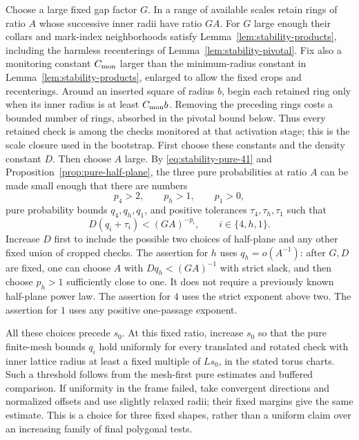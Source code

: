 Choose a large fixed gap factor $G$.  In a range of available scales
retain rings of ratio $A$ whose successive inner radii have ratio
$GA$.  For $G$ large enough their collars and mark-index
neighborhoods satisfy Lemma~\ref{lem:stability-products}, including
the harmless recenterings of Lemma~\ref{lem:stability-pivotal}.
Fix also a monitoring constant $C_{\rm mon}$ larger than the
minimum-radius constant in Lemma~\ref{lem:stability-products}, enlarged
to allow the fixed crops and recenterings.  Around an inserted square
of radius $b$, begin each retained ring only when its inner radius
is at least $C_{\rm mon}b$.  Removing the preceding rings costs a
bounded number of rings, absorbed in the pivotal bound below.
Thus every retained check is among the checks monitored at that
activation stage; this is the scale closure used in the bootstrap.
First choose these constants and the density constant $D$.  Then choose $A$
large.  By \eqref{eq:stability-pure-41} and
Proposition~\ref{prop:pure-half-plane}, the three pure probabilities
at ratio $A$ can be made small enough that there are numbers
\begin{equation}
 p_4>2,\qquad p_h>1,\qquad p_1>0,
 \label{eq:stability-exponents}
\end{equation}
pure probability bounds $q_4,q_h,q_1$, and positive tolerances
$\tau_4,\tau_h,\tau_1$ such that
\begin{equation}
 D(q_i+\tau_i)<(GA)^{-p_i},\qquad i\in\{4,h,1\}.
 \label{eq:stability-slack}
\end{equation}
Increase $D$ first to include the possible two choices of
half-plane and any other fixed union of cropped checks.
The assertion for $h$ uses $q_h=o(A^{-1})$: after $G,D$ are fixed,
one can choose $A$ with $Dq_h<(GA)^{-1}$ with strict slack, and
then choose $p_h>1$ sufficiently close to one.  It does not require
a previously known half-plane power law.  The assertion for $4$
uses the strict exponent above two.  The assertion for $1$ uses
any positive one-passage exponent.

All these choices precede $s_0$.  At this fixed ratio, increase
$s_0$ so that the pure finite-mesh bounds $q_i$ hold uniformly
for every translated and rotated check with inner lattice radius
at least a fixed multiple of $Ls_0$, in the stated torus charts.
Such a threshold follows from the mesh-first pure estimates and
buffered comparison.  If uniformity in the frame failed, take
convergent directions and normalized offsets and use slightly
relaxed radii; their fixed margins give the same estimate.
This is a choice for three fixed shapes, rather than a uniform
claim over an increasing family of final polygonal tests.

